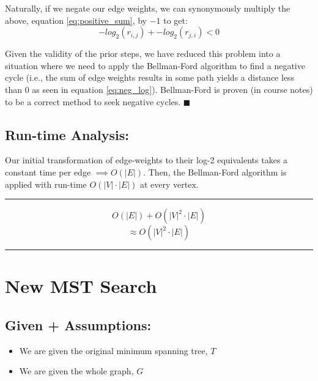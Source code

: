\documentclass[conference]{styles/acmsiggraph}
\newcommand{\?}{\stackrel{?}{=}}
\renewcommand\qedsymbol{$\blacksquare$}
\begin{document}
Naturally, if we negate our edge weights, we can synonymously multiply the above, equation \ref{eq:positive_sum}, by $-1$ to get:
\begin{equation} \label{eq:neg_log}
    -log_2(r_{i,j}) + -log_2(r_{j,i}) < 0
\end{equation}

Given the validity of the prior steps, we have reduced this problem into a situation where we need to apply the Bellman-Ford algorithm to find a negative cycle (i.e., the sum of edge weights results in some path yields a distance less than 0 as seen in equation \ref{eq:neg_log}).  Bellman-Ford is proven (in course notes) to be a correct method to seek negative cycles. \qedsymbol

\subsection{Run-time Analysis:}
Our initial transformation of edge-weights to their log-2 equivalents takes a constant time per edge $\implies O(|E|)$.  Then, the Bellman-Ford algorithm is applied with run-time $O(|V|\cdot |E|)$ at every vertex.

\rule{\textwidth}{0.4pt}
$$ O(|E|) + O(|V|^2 \cdot |E|)$$
$$ \approx O(|V|^2 \cdot |E|)$$
\rule{\textwidth}{0.4pt}























\newpage

\section{New MST Search}
\subsection{Given + Assumptions:}
\begin{itemize}[label= ---]
    \item We are given the original minimum spanning tree, $T$
    \item We are given the whole graph, $G$
\end{itemize}
\end{document}
